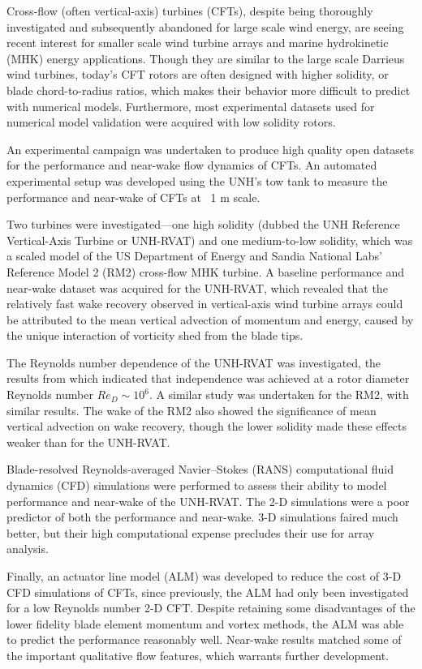 \begin{Abstractpage}

\setlength{\baselineskip}{1.5\baselineskip}
{

Cross-flow (often vertical-axis) turbines (CFTs), despite being thoroughly
investigated and subsequently abandoned for large scale wind energy, are seeing
recent interest for smaller scale wind turbine arrays and marine hydrokinetic
(MHK) energy applications. Though they are similar to the large scale Darrieus
wind turbines, today's CFT rotors are often designed with higher solidity, or
blade chord-to-radius ratios, which makes their behavior more difficult to
predict with numerical models. Furthermore, most experimental datasets used for
numerical model validation were acquired with low solidity rotors.

An experimental campaign was undertaken to produce high quality open datasets
for the performance and near-wake flow dynamics of CFTs. An automated
experimental setup was developed using the UNH's tow tank to measure the
performance and near-wake of CFTs at ~1 m scale.

Two turbines were investigated---one high solidity (dubbed the UNH Reference
Vertical-Axis Turbine or UNH-RVAT) and one medium-to-low solidity, which was a
scaled model of the US Department of Energy and Sandia National Labs' Reference
Model 2 (RM2) cross-flow MHK turbine. A baseline performance and near-wake
dataset was acquired for the UNH-RVAT, which revealed that the relatively fast
wake recovery observed in vertical-axis wind turbine arrays could be attributed
to the mean vertical advection of momentum and energy, caused by the unique
interaction of vorticity shed from the blade tips.

The Reynolds number dependence of the UNH-RVAT was investigated, the results
from which indicated that independence was achieved at a rotor diameter Reynolds
number $Re_D \sim 10^6$. A similar study was undertaken for the RM2, with
similar results. The wake of the RM2 also showed the significance of mean
vertical advection on wake recovery, though the lower solidity made these
effects weaker than for the UNH-RVAT.

Blade-resolved Reynolds-averaged Navier--Stokes (RANS) computational fluid
dynamics (CFD) simulations were performed to assess their ability to model
performance and near-wake of the UNH-RVAT. The 2-D simulations were a poor
predictor of both the performance and near-wake. 3-D simulations faired much
better, but their high computational expense precludes their use for array
analysis.

Finally, an actuator line model (ALM) was developed to reduce the cost of 3-D
CFD simulations of CFTs, since previously, the ALM had only been investigated
for a low Reynolds number 2-D CFT. Despite retaining some disadvantages of the
lower fidelity blade element momentum and vortex methods, the ALM was able to
predict the performance reasonably well. Near-wake results matched some of the
important qualitative flow features, which warrants further development.

}


\end{Abstractpage}
